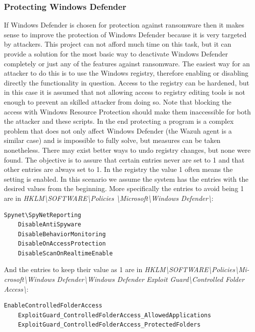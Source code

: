 \subsubsection{Protecting Windows Defender}
If Windows Defender is chosen for protection against ransomware then it makes sense to improve the protection of Windows Defender because it is very targeted by attackers.
This project can not afford much time on this task, but it can provide a solution for the most basic way to deactivate Windows Defender completely or just any of the features against ransomware.
The easiest way for an attacker to do this is to use the Windows registry, therefore enabling or disabling directly the functionality in question.
\linej
Access to the registry can be hardened, but in this case it is assumed that not allowing access to registry editing tools is not enough to prevent an skilled attacker from doing so.
Note that blocking the access with Windows Resource Protection should make them inaccessible for both the attacker and these scripts.
\linej
In the end protecting a program is a complex problem that does not only affect Windows Defender (the Wazuh agent is a similar case) and is impossible to fully solve, but measures can be taken nonetheless.
\linej
\linej
There may exist better ways to undo registry changes, but none were found.
The objective is to assure that certain entries never are set to 1 and that other entries are always set to 1.
In the registry the value 1 often means the setting is enabled.
In this scenario we assume the system has the entries with the desired values from the beginning.
\linej
More specifically the entries to avoid being 1 are in \textit{HKLM{\textbackslash}SOFTWARE{\textbackslash}Policies {\textbackslash}Microsoft{\textbackslash}Windows Defender{\textbackslash}}:
\begin{lstlisting}[style=xml,frame=none]
	Spynet\SpyNetReporting
	DisableAntiSpyware
	DisableBehaviorMonitoring
	DisableOnAccessProtection
	DisableScanOnRealtimeEnable
\end{lstlisting}
\linej
And the entries to keep their value as 1 are in \textit{HKLM{\textbackslash}SOFTWARE{\textbackslash}Policies{\textbackslash}Mi- crosoft{\textbackslash}Windows Defender{\textbackslash}Windows Defender Exploit Guard{\textbackslash}Controlled Folder Access{\textbackslash}}:
\begin{lstlisting}[style=xml,frame=none]
	EnableControlledFolderAccess
	ExploitGuard_ControlledFolderAccess_AllowedApplications
	ExploitGuard_ControlledFolderAccess_ProtectedFolders
\end{lstlisting}
